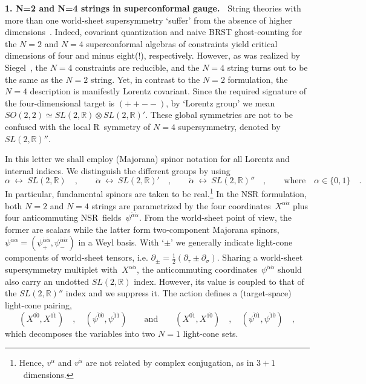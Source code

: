 \documentclass[a4paper,11pt]{article}
\def\a{\alpha}
\def\j{\psi}
\newcommand{\R}{\mathbb R}
\def\N2{$N{=}2$}
\def\NN4{$N{=}4$}
\def\pa{\mbox{$\partial$}}
\def\sfrac#1#2{{\textstyle\frac{#1}{#2}}}
\def\shalf{\sfrac{1}{2}}
\def\ad{{\dot{\alpha}}}
\def\zd{{\dot{0}}}
\def\od{{\dot{1}}}
\def\add{{\ddot{\alpha}}}
\def\zdd{{\ddot{0}}}
\def\odd{{\ddot{1}}}
\begin{document}
\noindent
{\bf 1. N=2 and N=4 strings in superconformal gauge.\ }
String theories with more than one world-sheet supersymmetry
`suffer' from the absence of higher dimensions~\cite{n2,n4}. 
Indeed, covariant quantization and naive BRST ghost-counting for the
\N2 and \NN4 superconformal algebras of constraints yield critical
dimensions of four and minus eight(!), respectively.
However, as was realized by Siegel~\cite{n4red}, the \NN4 constraints are
reducible, and the \NN4 string turns out to be the same as the \N2 string.
Yet, in contrast to the \N2 formulation, the \NN4 description is manifestly
Lorentz covariant. Since the required signature of the four-dimensional target
is $({+}{+}{-}{-})$, by `Lorentz group' we mean 
$SO(2,2)\simeq SL(2,\R)\otimes SL(2,\R)'$.
These global symmetries are not to be confused with the local R~symmetry
of \NN4 supersymmetry, denoted by~$SL(2,\R)''$.

In this letter we shall employ (Majorana) spinor notation for all Lorentz and
internal indices. We distinguish the different groups by using
\begin{equation}
\a\ \leftrightarrow\ SL(2,\R) \quad,\qquad
\ad\ \leftrightarrow\ SL(2,\R)' \quad,\qquad
\add\ \leftrightarrow\ SL(2,\R)'' \quad,\qquad
\textrm{where} \quad \a\in\{0,1\} \quad.
\end{equation}
In particular, fundamental spinors are taken to be real.\footnote{
Hence, $v^\a$ and $v^\ad$ are not related by complex conjugation,
as in $3{+}1$~dimensions.}
In the NSR formulation, both \N2 and \NN4 strings are parametrized by the 
four coordinates~$X^{\a\ad}$ plus four anticommuting NSR~fields~$\j^{\add\ad}$.
{}From the world-sheet point of view, the former are scalars while the latter
form two-component Majorana spinors, 
$\j^{\add\ad}=(\j_+^{\add\ad},\j_-^{\add\ad})$ in a Weyl basis.
With `$\pm$' we generally indicate light-cone components 
of world-sheet tensors, i.e. $\pa_\pm=\shalf(\pa_\tau\pm\pa_\sigma)$.
Sharing a world-sheet supersymmetry multiplet with~$X^{\a\ad}$, 
the anticommuting coordinates~$\j^{\add\ad}$ should also carry an undotted 
$SL(2,\R)$ index. However, its value is coupled to that of the $SL(2,\R)''$ 
index and we suppress it.
The action defines a (target-space) light-cone pairing,
\begin{equation}
(X^{0\zd},X^{1\od})\quad,\quad(\j^{\zdd\zd},\j^{\odd\od})
\qquad\textrm{and}\qquad
(X^{0\od},X^{1\zd})\quad,\quad(\j^{\zdd\od},\j^{\odd\zd}) \quad,
\end{equation}
which decomposes the variables into two $N{=}1$ light-cone sets.
\end{document}
